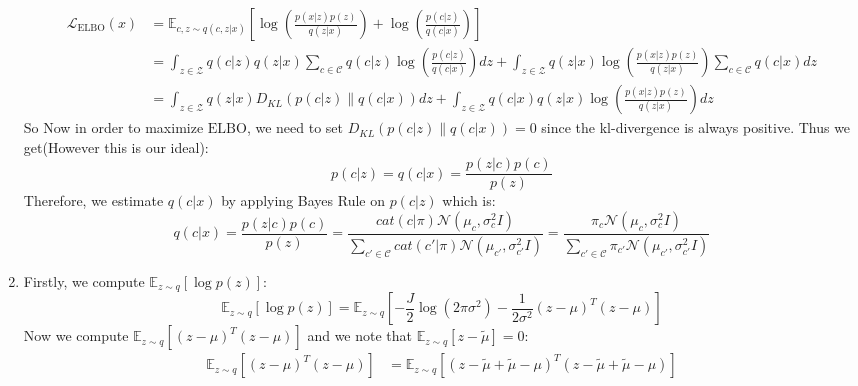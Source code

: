 \documentclass{article}
\begin{document}
\begin{enumerate}
    \begin{equation*}
        \begin{aligned}
            \mathcal{L}_{\mathrm{ELBO}}(x) &= 
            \mathbb{E}_{c, z \sim q(c, z|x)} \left[ 
            \log \left( \frac{p(x|z)p(z)}{q(z|x)} \right) 
            + \log \left( \frac{p(c|z)}{q(c|x)} \right)
            \right] \\
            &= \int_{z \in\mathcal{Z}} q(c|z ) q(z|x) \sum_{c \in \mathcal{C}}  q(c|z ) \log \left( \frac{p(c|z)}{q(c|x)} \right) dz +
            \int_{z \in\mathcal{Z}} q(z|x) \log \left( \frac{p(x|z)p(z)}{q(z|x)} \right)  \sum_{c \in \mathcal{C}} q(c|x) dz \\
            &= %
            \int_{z \in\mathcal{Z}} q(z|x) D_{KL}(p(c|z) \parallel q(c|x)) dz
            + \int_{z \in\mathcal{Z}} q(c|x) q(z|x) \log \left( \frac{p(x|z)p(z)}{q(z|x)} \right) dz
        \end{aligned}
    \end{equation*}
    So Now in order to maximize $\mathrm{ELBO}$, we need to set $D_{KL}(p(c|z) \parallel q(c|x)) =0 $ since the kl-divergence is always positive. Thus we get(However this is our ideal):
    \begin{equation*}
        p(c|z) = q(c|x) = \frac{p(z|c) p(c)}{p(z)} 
    \end{equation*}
    Therefore, we estimate $q(c|x)$ by applying Bayes Rule on $p(c|z)$ which is:
    \begin{equation*}
        q(c|x) = \frac{p(z|c) p(c)}{p(z)} = 
        \frac{ cat(c|\pi) \mathcal{N}(\mu_c, \sigma_c^2 I) }{\sum_{c' \in \mathcal{C}}  cat(c'|\pi) \mathcal{N}(\mu_{c'}, \sigma_{c'}^2 I) } = 
        \frac{ \pi_c \mathcal{N}(\mu_c, \sigma_c^2 I) }{\sum_{c' \in \mathcal{C}}  \pi_{c'} \mathcal{N}(\mu_{c'}, \sigma_{c'}^2 I) } 
    \end{equation*}
    \item 
    Firstly, we compute $\mathbb{E}_{z \sim q} [\log p(z)]$:
    \[ \mathbb{E}_{z \sim q} [\log p(z)] = \mathbb{E}_{z \sim q} \left[ -\frac{J}{2} \log(2\pi \sigma^2) - \frac{1}{2\sigma^2} (z - \mu)^T (z - \mu) \right] \]
    Now we compute $\mathbb{E}_{z \sim q} \left[ (z - \mu)^T (z - \mu) \right]$ and we note that $\mathbb{E}_{z\sim q}[z−\tilde{\mu}]=0 $:
    \begin{align*}
    \mathbb{E}_{z \sim q} \left[ (z - \mu)^T (z - \mu) \right] &= \mathbb{E}_{z \sim q} \left[ (z - \tilde{\mu} + \tilde{\mu} - \mu)^T (z - \tilde{\mu} + \tilde{\mu} - \mu) \right] \\

\end{align*}
\end{enumerate}
\end{document}
